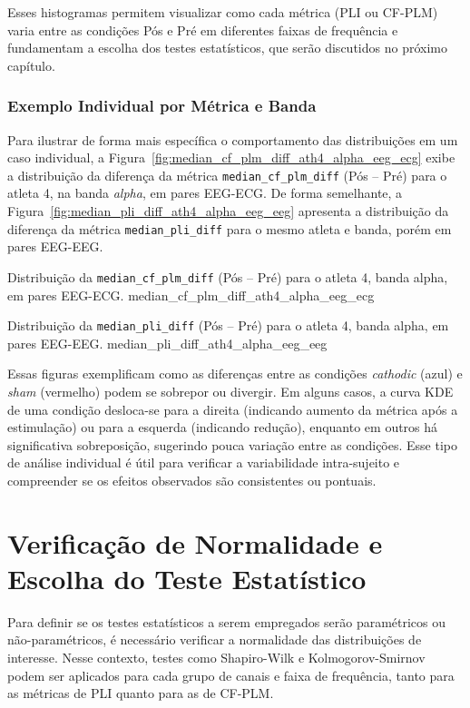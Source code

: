 Esses histogramas permitem visualizar como cada métrica (PLI ou CF-PLM) varia entre as condições Pós e Pré em diferentes faixas de frequência e fundamentam a escolha dos testes estatísticos, que serão discutidos no próximo capítulo.
\subsubsection{Exemplo Individual por Métrica e Banda}
Para ilustrar de forma mais específica o comportamento das distribuições em um caso individual, a Figura~\ref{fig:median_cf_plm_diff_ath4_alpha_eeg_ecg} exibe a distribuição da diferença da métrica \texttt{median\_cf\_plm\_diff} (Pós -- Pré) para o atleta 4, na banda \emph{alpha}, em pares EEG-ECG. De forma semelhante, a Figura~\ref{fig:median_pli_diff_ath4_alpha_eeg_eeg} apresenta a distribuição da diferença da métrica \texttt{median\_pli\_diff} para o mesmo atleta e banda, porém em pares EEG-EEG.

{Distribuição da \texttt{median\_cf\_plm\_diff} (Pós -- Pré) para o atleta 4, banda alpha, em pares EEG-ECG.}
{median_cf_plm_diff_ath4_alpha_eeg_ecg}

{Distribuição da \texttt{median\_pli\_diff} (Pós -- Pré) para o atleta 4, banda alpha, em pares EEG-EEG.}
{median_pli_diff_ath4_alpha_eeg_eeg}

Essas figuras exemplificam como as diferenças entre as condições \emph{cathodic} (azul) e \emph{sham} (vermelho) podem se sobrepor ou divergir. Em alguns casos, a curva KDE de uma condição desloca-se para a direita (indicando aumento da métrica após a estimulação) ou para a esquerda (indicando redução), enquanto em outros há significativa sobreposição, sugerindo pouca variação entre as condições. Esse tipo de análise individual é útil para verificar a variabilidade intra-sujeito e compreender se os efeitos observados são consistentes ou pontuais.

\section{Verificação de Normalidade e Escolha do Teste Estatístico}
Para definir se os testes estatísticos a serem empregados serão paramétricos ou não-paramétricos, é necessário verificar a normalidade das distribuições de interesse. Nesse contexto, testes como Shapiro-Wilk e Kolmogorov-Smirnov podem ser aplicados para cada grupo de canais e faixa de frequência, tanto para as métricas de PLI quanto para as de CF-PLM.

